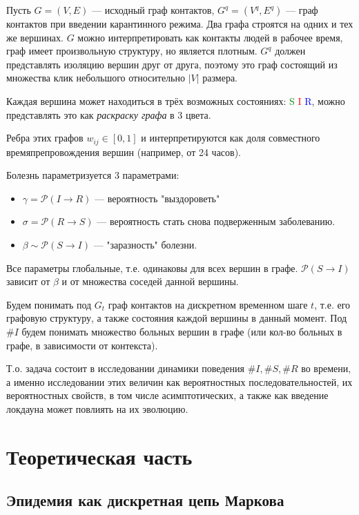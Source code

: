 	Пусть $ G = (V, E) $ --- исходный граф контактов, $ G^q = (V^q, E^q) $ --- граф контактов при введении карантинного режима. Два графа строятся на одних и тех же вершинах. $ G $ можно интерпретировать как контакты людей в рабочее время, граф имеет произвольную структуру, но является плотным. $G^q$ должен представлять изоляцию вершин друг от друга, поэтому это граф состоящий из множества клик небольшого относительно $\lvert V \rvert$ размера.
	
	Каждая вершина может находиться в трёх возможных состояниях: \textcolor{green}{S} \textcolor{red}{I} \textcolor{blue}{R}, можно представлять это как \textit{раскраску графа} в 3 цвета. 
	
	Ребра этих графов $w_{ij} \in [0, 1]$ и интерпретируются как доля совместного времяпрепровождения вершин (например, от 24 часов).
	
	Болезнь параметризуется 3 параметрами:
	
	\begin{itemize}
		\item $\gamma = \mathcal{P}(I \rightarrow R)$ --- вероятность "выздороветь"
		\item $\sigma = \mathcal{P}(R \rightarrow S)$ --- вероятность стать снова подверженным заболеванию.
		\item $\beta \sim \mathcal{P}(S \rightarrow I)$ --- "заразность" болезни.
	\end{itemize}

	Все параметры глобальные, т.е. одинаковы для всех вершин в графе. $\mathcal{P}(S \rightarrow I)$ зависит от $\beta$ и от множества соседей данной вершины.
	
	Будем понимать под $ G_t $ граф контактов на дискретном временном шаге $ t $, т.е. его графовую структуру, а также состояния каждой вершины в данный момент. Под $ \# I $ будем понимать множество больных вершин в графе (или кол-во больных в графе, в зависимости от контекста). 
	
	Т.о. задача состоит в исследовании динамики поведения $ \# I, \# S, \# R $ во времени, а именно исследовании этих величин как вероятностных последовательностей, их вероятностных свойств, в том числе асимптотических, а также как введение локдауна может повлиять на их эволюцию.
	
	\section*{Теоретическая часть}
	
	\subsection*{Эпидемия как дискретная цепь Маркова}
	
